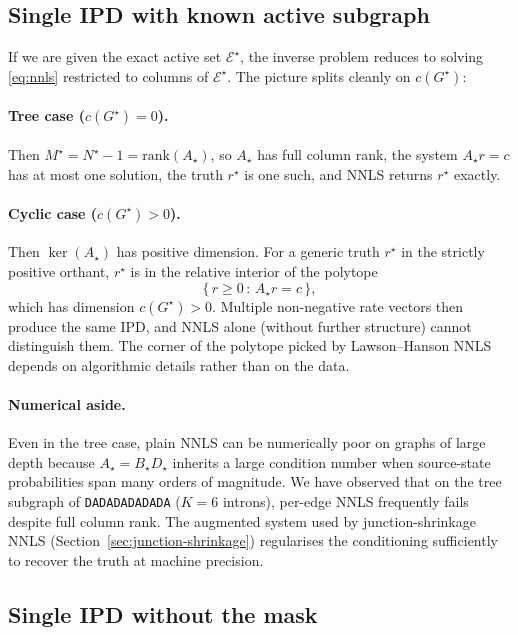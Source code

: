 \documentclass[11pt, a4paper]{article}
\newcommand{\rstar}{r^{\star}}
\newcommand{\Estar}{\mathcal{E}^{\star}}
\newcommand{\Gstar}{G^{\star}}
\newcommand{\Astar}{A_{\star}}
\newcommand{\Bstar}{B_{\star}}
\newcommand{\Dstar}{D_{\star}}
\begin{document}
\subsection{Single IPD with known active subgraph}
\label{sec:single-ipd-mask}

If we are given the exact active set $\Estar$, the inverse problem reduces to solving \eqref{eq:nnls} restricted to columns of $\Estar$. The picture splits cleanly on $c(\Gstar)$:

\paragraph{Tree case ($c(\Gstar) = 0$).} Then $M^{\star} = N^{\star} - 1 = \mathrm{rank}(\Astar)$, so $\Astar$ has full column rank, the system $\Astar r = c$ has at most one solution, the truth $\rstar$ is one such, and NNLS returns $\rstar$ exactly.

\paragraph{Cyclic case ($c(\Gstar) > 0$).} Then $\ker(\Astar)$ has positive dimension. For a generic truth $\rstar$ in the strictly positive orthant, $\rstar$ is in the relative interior of the polytope
\[
\big\{\, r \geq 0 \,:\, \Astar r = c \,\big\},
\]
which has dimension $c(\Gstar) > 0$. Multiple non-negative rate vectors then produce the same IPD, and NNLS alone (without further structure) cannot distinguish them. The corner of the polytope picked by Lawson--Hanson NNLS depends on algorithmic details rather than on the data.

\paragraph{Numerical aside.} Even in the tree case, plain NNLS can be numerically poor on graphs of large depth because $\Astar = \Bstar \Dstar$ inherits a large condition number when source-state probabilities span many orders of magnitude. We have observed that on the tree subgraph of \texttt{DADADADADADA} ($K = 6$ introns), per-edge NNLS frequently fails despite full column rank. The augmented system used by junction-shrinkage NNLS (Section~\ref{sec:junction-shrinkage}) regularises the conditioning sufficiently to recover the truth at machine precision.

\subsection{Single IPD without the mask}
\label{sec:no-mask}
\end{document}

